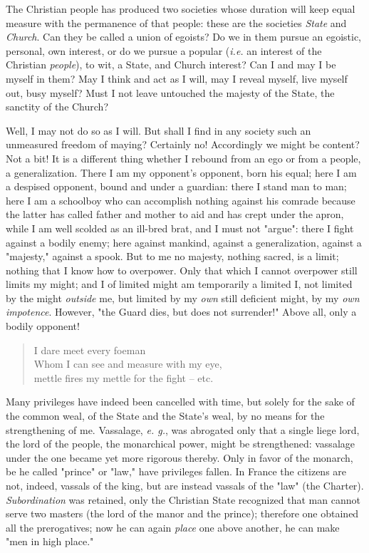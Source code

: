 The Christian people has produced two societies whose duration will keep equal 
measure with the permanence of that people: these are the societies 
\textit{State} and \textit{Church}. Can they be called a union of egoists? Do 
we in them pursue an egoistic, personal, own interest, or do we pursue a 
popular (\textit{i.e.} an interest of the Christian \textit{people}), to wit, 
a State, and Church interest? Can I and may I be myself in them? May I think 
and act as I will, may I reveal myself, live myself out, busy myself? Must I 
not leave untouched the majesty of the State, the sanctity of the Church?

Well, I may not do so as I will. But shall I find in any society such an 
unmeasured freedom of maying? Certainly no! Accordingly we might be content? 
Not a bit! It is a different thing whether I rebound from an ego or from a 
people, a generalization. There I am my opponent's opponent, born his equal; 
here I am a despised opponent, bound and under a guardian: there I stand man 
to man; here I am a schoolboy who can accomplish nothing against his comrade 
because the latter has called father and mother to aid and has crept under the 
apron, while I am well scolded as an ill-bred brat, and I must not 
"{}argue"{}: there I fight against a bodily enemy; here against mankind, 
against a generalization, against a "{}majesty,"{} against a spook. But to me 
no majesty, nothing sacred, is a limit; nothing that I know how to overpower. 
Only that which I cannot overpower still limits my might; and I of limited 
might am temporarily a limited I, not limited by the might \textit{outside} 
me, but limited by my \textit{own} still deficient might, by my \textit{own 
impotence}. However, "{}the Guard dies, but does not surrender!"{} Above all, 
only a bodily opponent!

\begin{quotation}

\noindent{} I dare meet every foeman\\
 Whom I can see and measure with my eye,\\
 mettle fires my mettle for the fight -- etc. \end{quotation}

\noindent{}Many privileges have indeed been cancelled with time, but solely 
for the sake of the common weal, of the State and the State's weal, by no 
means for the strengthening of me. Vassalage, \textit{e. g.}, was abrogated 
only that a single liege lord, the lord of the people, the monarchical power, 
might be strengthened: vassalage under the one became yet more rigorous 
thereby. Only in favor of the monarch, be he called "{}prince"{} or "{}law,"{} 
have privileges fallen. In France the citizens are not, indeed, vassals of the 
king, but are instead vassals of the "{}law"{} (the Charter). 
\textit{Subordination} was retained, only the Christian State recognized that 
man cannot serve two masters (the lord of the manor and the prince); therefore 
one obtained all the prerogatives; now he can again \textit{place} one above 
another, he can make "{}men in high place."{}

